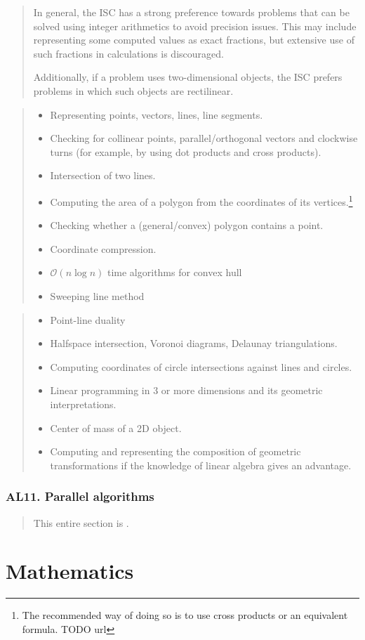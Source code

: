 \documentclass[a4paper,11pt,oneside]{article}
\newcommand{\cmark}{\ding{51}}%
\newcommand{\xmark}{\ding{55}}%
\newcommand{\ccode}{{\small\cmark\faFileText}}
\newcommand{\cnfoc}{{\small\faQuestion}}
\newcommand{\cexcl}{{\small\xmark}}
\newcommand{\Icodeonly}{\item[\hbox to 1.8em{\ccode\hfill}]}
\newcommand{\Iexcluded}{\item[\hbox to 1.8em{\cexcl\hfill}]}
\newenvironment{myitemize}{\begin{quote}\begin{itemize}\itemsep 0pt}{\end{itemize}\end{quote}}
\begin{document}
    \begin{quote}
    In general, the ISC has a strong preference towards problems that can be solved using integer
    arithmetics to avoid precision issues. This may include representing some computed values as 
    exact fractions, but extensive use of such fractions in calculations is discouraged.

    Additionally, if a problem uses two-dimensional objects, the ISC prefers problems in which such objects are rectilinear.
    \end{quote}

    \begin{myitemize}
    \Icodeonly Representing points, vectors, lines, line segments.
    \Icodeonly Checking for collinear points, parallel/orthogonal vectors and clockwise turns (for example, by using dot products and cross products).
    \Icodeonly Intersection of two lines.
    \Icodeonly Computing the area of a polygon from the coordinates of its vertices.\footnote{The recommended way of doing so is to use cross products or an equivalent formula. TODO url}
    \Icodeonly Checking whether a (general/convex) polygon contains a point.
    \Icodeonly Coordinate compression.
    \Icodeonly $\mathcal{O}(n\log{n})$ time algorithms for convex hull
    \Icodeonly Sweeping line method
    \end{myitemize}
  
    \begin{myitemize}
    \Iexcluded Point-line duality
    \Iexcluded Halfspace intersection, Voronoi diagrams, Delaunay triangulations.
    \Iexcluded Computing coordinates of circle intersections against lines and circles.
    \Iexcluded Linear programming in 3 or more dimensions and its geometric interpretations.
    \Iexcluded Center of mass of a 2D object.
    \Iexcluded Computing and representing the composition of geometric transformations if the knowledge of linear algebra gives an advantage.
    \end{myitemize}

    \subsubsection*{AL11. Parallel algorithms}%

    \begin{quote}
    This entire section is \cnfoc.
    \end{quote}



\section {Mathematics}
\label{subsec:mathematics}
\end{document}
